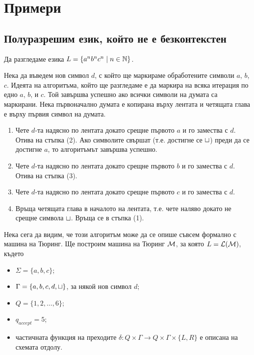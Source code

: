 


\section{Примери}

\subsection*{Полуразрешим език, който не е безконтекстен}

\begin{example}
  Да разгледаме езика $L = \{a^nb^nc^n \mid n\in\mathbb{N}\}$.
 
  Нека да въведем нов символ $d$, с който ще маркираме обработените символи $a$, $b$, $c$.
  Идеята на алгоритъма, който ще разгледаме е да маркира на всяка итерация по едно $a$, $b$, и $c$.
  Той завършва успешно ако всички символи на думата са маркирани.
  Нека първоначално думата е копирана върху лентата и четящата глава е върху първия символ на думата.
  \begin{enumerate}[(1)]
  \item 
    Чете $d$-та надясно по лентата докато срещне първото $a$ и го замества с $d$. Отива на стъпка (2).
    Ако символите свършат (т.е. достигне се $\sqcup$) преди да се достигне $a$,
    то алгоритъмът завършва успешно.
  \item
    Чете $d$-та надясно по лентата докато срещне първото $b$ и го замества с $d$.
    Отива на стъпка (3).
  \item
    Чете $d$-та надясно по лентата докато срещне първото $c$ и го замества с $d$.
  \item
    Връща четящата глава в началото на лентата, т.е. чете наляво докато не срещне символа $\sqcup$.
    Връща се в стъпка (1). 
  \end{enumerate}

  Нека сега да видим, че този алгоритъм може да се опише съвсем формално с машина на Тюринг.
  Ще построим машина на Тюринг $\mathcal{M}$, за която $L = \mathcal{L}(\mathcal{M})$, където
  \begin{itemize}
  \item 
    $\Sigma = \{a,b,c\}$;
  \item
    $\Gamma = \{a,b,c,d,\sqcup\}$, за някой нов символ $d$;
  \item
    $Q = \{1,2,\dots,6\}$;
  \item
    $q_{accept} = 5$;
  \item
    частичната функция на преходите $\delta:Q\times\Gamma \to Q\times\Gamma\times\{L,R\}$
    е описана на схемата отдолу.
  \end{itemize}


\end{example}
